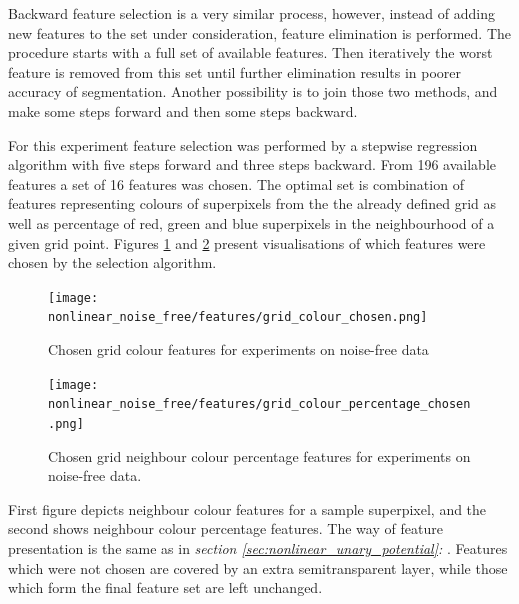 Backward feature selection is a very similar process, however, instead of adding new features to the set under consideration, feature elimination is performed. The procedure starts with a full set of available features. Then iteratively the worst feature is removed from this set until further elimination results in poorer accuracy of segmentation. Another possibility is to join those two methods, and make some steps forward and then some steps backward.

For this experiment feature selection was performed by a stepwise regression algorithm with five steps forward and three steps backward. From 196 available features a set of 16 features was chosen. The optimal set is combination of features representing colours of superpixels from the the already defined grid as well as percentage of red, green and blue superpixels in the neighbourhood of a given grid point. Figures \ref{fig:nonlinear_noise_free_features_colour} and \ref{fig:nonlinear_noise_free_features_percentage} present visualisations of which features were chosen by the selection algorithm.
\begin{figure}
    \centering
    \texttt{[image: nonlinear\_noise\_free/features/grid\_colour\_chosen.png]}
    \caption{Chosen grid colour features for experiments on noise-free data}
    \label{fig:nonlinear_noise_free_features_colour}
\end{figure}
\begin{figure}
    \centering
    \texttt{[image: nonlinear\_noise\_free/features/grid\_colour\_percentage\_chosen.png]}
    \caption{Chosen grid neighbour colour percentage features for experiments on noise-free data.}
    \label{fig:nonlinear_noise_free_features_percentage}
\end{figure}

First figure depicts neighbour colour features for a sample superpixel, and the second shows neighbour colour percentage features. The way of feature presentation is the same as in \textit{section \ref{sec:nonlinear_unary_potential}: }. Features which were not chosen are covered by an extra semitransparent layer, while those which form the final feature set are left unchanged.


